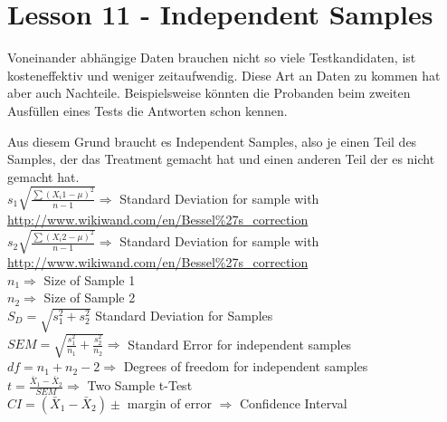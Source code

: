 \documentclass[landscape]{article}
\begin{document}
	\section{Lesson 11 - Independent Samples}
		Voneinander abhängige Daten brauchen nicht so viele Testkandidaten, ist kosteneffektiv und weniger zeitaufwendig. Diese Art an Daten zu kommen hat aber auch Nachteile. Beispielsweise könnten die Probanden beim zweiten Ausfüllen eines Tests die Antworten schon kennen.

		Aus diesem Grund braucht es Independent Samples, also je einen Teil des Samples, der das Treatment gemacht hat und einen anderen Teil der es nicht gemacht hat.
		\\\(s_1 \sqrt{\frac{\sum{(X_i1 - \mu)^2}}{n - 1}} \Rightarrow\) Standard Deviation for sample with
		 \href{Bessel\'s correction}{http://www.wikiwand.com/en/Bessel\%27s\_correction}
		\\\(s_2 \sqrt{\frac{\sum{(X_i2 - \mu)^2}}{n - 1}} \Rightarrow\) Standard Deviation for sample with \href{Bessel\'s correction}{http://www.wikiwand.com/en/Bessel\%27s\_correction}
		\\\(n_1 \Rightarrow\) Size of Sample 1
		\\\(n_2 \Rightarrow\) Size of Sample 2
		\\\(S_D = \sqrt{s_1^2 + s_2^2}\) Standard Deviation for Samples
		\\\(SEM = \sqrt{\frac{s_1^2}{n_1} + \frac{s_2^2}{n_2}} \Rightarrow\) Standard Error for independent samples
		\\\(df = n_1 + n_2 - 2 \Rightarrow\) Degrees of freedom for independent samples
		\\\(t = \frac{\bar{X}_1 - \bar{X}_2}{SEM} \Rightarrow\) Two Sample t-Test
		\\\(CI = (\bar{X}_1 - \bar{X}_2) \pm \) margin of error \(\Rightarrow\) Confidence Interval
	
\end{document}
